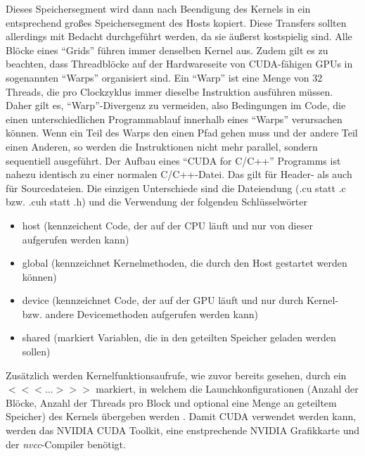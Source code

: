 \documentclass[12pt, onecolumn, notitlepage]{scrartcl}
\begin{document}
Dieses Speichersegment wird dann nach Beendigung des Kernels in ein entsprechend großes Speichersegment des Hosts kopiert. Diese Transfers sollten allerdings mit Bedacht durchgeführt werden, da sie äußerst kostspielig sind.\newline
Alle Blöcke eines \enquote{Grids} führen immer denselben Kernel aus. 
Zudem gilt es zu beachten, dass Threadblöcke auf der Hardwareseite von CUDA-fähigen GPUs in sogenannten \enquote{Warps} organisiert sind. Ein \enquote{Warp} ist eine Menge von 32 Threads, die pro Clockzyklus immer dieselbe Instruktion ausführen müssen. Daher gilt es, \enquote{Warp}-Divergenz zu
vermeiden, also Bedingungen im Code, die einen unterschiedlichen Programmablauf innerhalb eines \enquote{Warps} verursachen können. Wenn ein Teil des Warps den einen Pfad gehen muss und der andere Teil einen Anderen, so werden die Instruktionen nicht mehr parallel, sondern sequentiell ausgeführt. \newline
Der Aufbau eines \enquote{CUDA for C/C++} Programms ist nahezu identisch zu einer normalen C/C++-Datei. Das gilt für Header- als auch für Sourcedateien.
Die einzigen Unterschiede sind die Dateiendung (.cu statt .c bzw. .cuh statt .h) und die Verwendung der folgenden Schlüsselwörter
\begin{itemize}
\item \underline{\hspace{0.5cm}}host\underline{\hspace{0.5cm}} (kennzeichent Code, der auf der CPU läuft und nur von dieser aufgerufen werden kann)
\item \underline{\hspace{0.5cm}}global\underline{\hspace{0.5cm}} (kennzeichnet Kernelmethoden, die durch den Host gestartet werden können) 
\item \underline{\hspace{0.5cm}}device\underline{\hspace{0.5cm}} (kennzeichnet Code, der auf der GPU läuft und nur durch Kernel- bzw. andere Devicemethoden aufgerufen werden kann) 
\item \underline{\hspace{0.5cm}}shared\underline{\hspace{0.5cm}}
(markiert Variablen, die in den geteilten Speicher geladen werden sollen) 
\end{itemize}  
Zusätzlich werden Kernelfunktionsaufrufe, wie zuvor bereits gesehen, durch ein \newline
$<<<...>>>$ markiert, in welchem die Launchkonfigurationen (Anzahl der Blöcke, Anzahl der Threads pro Block und optional eine Menge an geteiltem Speicher) des Kernels übergeben werden . \newline
Damit CUDA verwendet werden kann, werden das NVIDIA CUDA Toolkit, eine enstprechende NVIDIA Grafikkarte und 
der \textit{nvcc}-Compiler benötigt.
\end{document}
